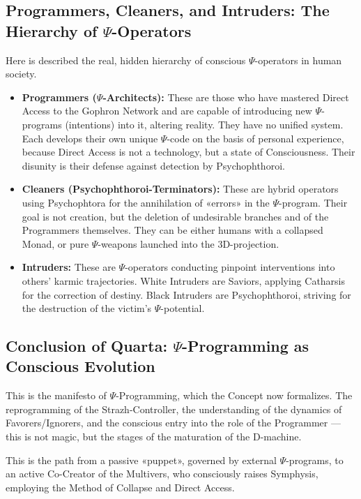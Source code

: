 \documentclass[a4paper,12pt]{article}
\begin{document}
	\subsection{Programmers, Cleaners, and Intruders: The Hierarchy of $\Psi$-Operators}
	
	Here is described the real, hidden hierarchy of conscious $\Psi$-operators in human society.
	
	\begin{itemize}
		\item \textbf{Programmers ($\Psi$-Architects):} These are those who have mastered Direct Access to the Gophron Network and are capable of introducing new $\Psi$-programs (intentions) into it, altering reality. They have no unified system. Each develops their own unique $\Psi$-code on the basis of personal experience, because Direct Access is not a technology, but a state of Consciousness. Their disunity is their defense against detection by Psychophthoroi.
		
		\item \textbf{Cleaners (Psychophthoroi-Terminators):} These are hybrid operators using Psychophtora for the annihilation of «errors» in the $\Psi$-program. Their goal is not creation, but the deletion of undesirable branches and of the Programmers themselves. They can be either humans with a collapsed Monad, or pure $\Psi$-weapons launched into the 3D-projection.
		
		\item \textbf{Intruders:} These are $\Psi$-operators conducting pinpoint interventions into others' karmic trajectories. White Intruders are Saviors, applying Catharsis for the correction of destiny. Black Intruders are Psychophthoroi, striving for the destruction of the victim's $\Psi$-potential.
	\end{itemize}
	
	\subsection{Conclusion of Quarta: $\Psi$-Programming as Conscious Evolution}
	
	This is the manifesto of $\Psi$-Programming, which the Concept now formalizes. The reprogramming of the Strazh-Controller, the understanding of the dynamics of Favorers/Ignorers, and the conscious entry into the role of the Programmer — this is not magic, but the stages of the maturation of the D-machine.
	
	This is the path from a passive «puppet», governed by external $\Psi$-programs, to an active Co-Creator of the Multivers, who consciously raises Symphysis, employing the Method of Collapse and Direct Access.
	
\end{document}
